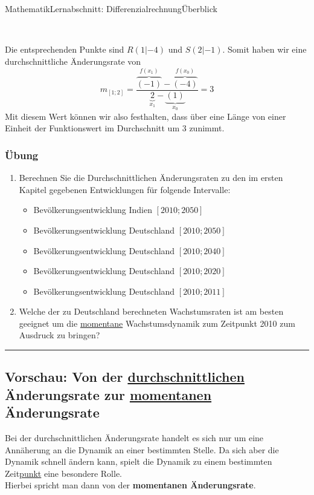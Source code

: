 \documentclass[11pt,twocolumn,oneside,openany,headings=optiontotoc,11pt,numbers=noenddot,final]{article}
\begin{document}
\begin{worksheet}{Mathematik}{Lernabschnitt: Differenzialrechnung}{Überblick}
\begin{minipage}{0.2\textwidth}
		\end{minipage}\\
		\par\noindent
		Die entsprechenden Punkte sind \(R(1|-4)\) und \(S(2|-1)\). Somit haben wir eine durchschnittliche Änderungsrate von
		\[m_{[1;2]} = \frac{\overbrace{(-1)}^{f(x_1)} - \overbrace{(-4)}^{f(x_0)}}{\underbrace{2}_{x_1} - \underbrace{(1)}_{x_0}} = 3\]
		Mit diesem Wert können wir also festhalten, dass über eine Länge von einer Einheit der Funktionswert im Durchschnitt um \(3\) zunimmt.\\
		\subsubsection{Übung}
		\begin{enumerate}
			\item Berechnen Sie die Durchschnittlichen Änderungsraten zu den im ersten Kapitel gegebenen Entwicklungen für folgende Intervalle:
			\begin{itemize}[label=-]
				\item Bevölkerungsentwicklung Indien \([2010;2050]\)
				\item Bevölkerungsentwicklung Deutschland \([2010;2050]\)
				\item Bevölkerungsentwicklung Deutschland \([2010;2040]\)
				\item Bevölkerungsentwicklung Deutschland \([2010;2020]\)
				\item Bevölkerungsentwicklung Deutschland \([2010;2011]\)
			\end{itemize}
			\item Welche der zu Deutschland berechneten Wachstumsraten ist am besten geeignet um die \underline{momentane} Wachstumsdynamik zum Zeitpunkt 2010 zum Ausdruck zu bringen?
		\end{enumerate}
		\rule{0.48\textwidth}{0.1pt}
		\subsection*{Vorschau: Von der \underline{durchschnittlichen} Änderungsrate zur \underline{momentanen} Änderungsrate}
		Bei der durchschnittlichen Änderungsrate handelt es sich nur um eine Annäherung an die Dynamik an einer bestimmten Stelle. Da sich aber die Dynamik schnell ändern kann, spielt die Dynamik zu einem bestimmten Zeit\underline{punkt} eine besondere Rolle.\\
		Hierbei spricht man dann von der \textbf{momentanen Änderungsrate}.

\end{worksheet}
\end{document}

